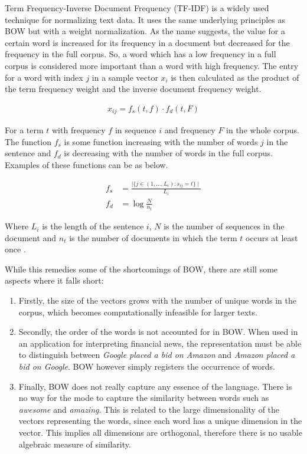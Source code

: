 Term Frequency-Inverse Document Frequency (TF-IDF) is a widely used technique for normalizing text data. It uses the same underlying principles as BOW but with a weight normalization. As the name suggests, the value for a certain word is increased for its frequency in a document but decreased for the frequency in the full corpus. So, a word which has a low frequency in a full corpus is considered more important than a word with high frequency. The entry for a word with index $j$ in a sample vector $x_i$ is then calculated as the product of the term frequency weight and the inverse document frequency weight. 

\begin{align*}
    x_{ij} = f_s(t,f) \cdot f_d(t,F)
\end{align*}

For a term $t$ with frequency $f$ in sequence $i$ and frequency $F$ in the whole corpus. The function $f_s$ is some function increasing with the number of words $j$ in the sentence and $f_d$ is decreasing with the number of words in the full corpus. Examples of these functions can be as below. 

\begin{align*}
    f_s &= \frac{\mid \{ j \in (1, \hdots , L_i) : s_{ij} = t  \} \mid}{L_i} \\
    f_d &= \log{\frac{N}{n_t}}
\end{align*}

Where $L_i$ is the length of the sentence $i$, $N$ is the number of sequences in the document and $n_t$ is the number of documents in which the term $t$ occurs at least once \citep{manning2008introduction}.

While this remedies some of the shortcomings of BOW, there are still some aspects where it falls short: 
\begin{enumerate}
    \item Firstly, the size of the vectors grows with the number of unique words in the corpus, which becomes computationally infeasible for larger texts. 
    \item Secondly, the order of the words is not accounted for in BOW. When used in an application for interpreting financial news, the representation must be able to distinguish between \textit{Google placed a bid on Amazon} and \textit{Amazon placed a bid on Google}. BOW however simply registers the occurrence of words. 
    \item Finally, BOW does not really capture any essence of the language. There is no way for the mode to capture the similarity between words such as \textit{awesome} and \textit{amazing}. This is related to the large dimensionality of the vectors representing the words, since each word has a unique dimension in the vector. This implies all dimensions are orthogonal, therefore there is no usable algebraic measure of similarity. 
\end{enumerate}

